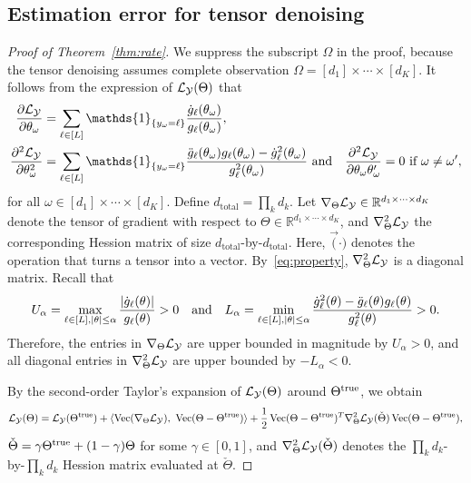 \documentclass[11pt]{article}
\theoremstyle{plain}
\theoremstyle{definition}
\providecommand{\DIFaddbegin}{} %
\providecommand{\DIFaddend}{} %
\begin{document}
\DIFaddend \subsection{Estimation error for tensor denoising}\DIFaddbegin \label{sec:proofMSE}
\DIFaddend \begin{proof}[Proof of Theorem~\ref{thm:rate}]
We suppress the subscript $\Omega$ in the proof, because the tensor denoising assumes complete observation $\Omega=[d_1]\times \cdots \times [d_K]$. It follows from the expression of $\mathcal{L}_{\mathcal{Y}}(\Theta)$ that
\begin{align}\label{eq:property}
{\partial \flogl\over \partial \theta_\omega}&=\sum_{\ell\in[L]}\mathds{1}_{\{y_{\omega}=\ell\}}
{\dot{g}_\ell(\theta_\omega)\over g_\ell(\theta_\omega)},\notag\\
{\partial^2 \flogl\over \partial \theta_\omega^2}&=\sum_{\ell\in[L]}\mathds{1}_{\{y_\omega=\ell\}}{\ddot{g}_\ell(\theta_\omega)g_\ell(\theta_\omega)-\dot{g}^2_\ell(\theta_\omega)\over g^2_\ell(\theta_\omega)}\ \text{and}\quad
{\partial^2 \flogl\over \partial \theta_\omega \theta_\omega'}=0\ \text{if}\ \omega\neq \omega',
\end{align}
for all $\omega\in[d_1]\times \cdots \times [d_K]$.
Define $d_{\text{total}}=\prod_k d_k$. Let $\nabla_{\Theta}\mathcal{L}_{\mathcal{Y}}\in\mathbb{R}^{d_1\times\cdots\times d_K}$ denote the tensor of gradient with respect to $\Theta\in\mathbb{R}^{d_1\times \cdots\times d_K}$, and $\nabla^2_{\Theta}\mathcal{L}_{\mathcal{Y}}$ the corresponding Hession matrix of size $d_\text{total}$-by-$d_{\text{total}}$. Here, $\Vec(\cdot)$ denotes the operation that turns a tensor into a vector. By~\eqref{eq:property}, $\nabla^2_{\Theta}\mathcal{L}_{\mathcal{Y}}$ is a diagonal matrix. Recall that
\begin{equation}\label{eq:bound}
U_\alpha=\max_{\ell\in[L],|\theta|\leq \alpha}{|\dot{g}_\ell(\theta)|\over g_\ell(\theta)}>0 \quad \text{and}\quad
L_\alpha=\min_{\ell\in[L],|\theta|\leq \alpha} {\dot{g}^2_\ell(\theta)-\ddot{g}_\ell(\theta)g_\ell(\theta)\over g^2_\ell(\theta)}>0.
\end{equation}
Therefore, the entries in $\nabla_{\Theta}\mathcal{L}_{\mathcal{Y}}$ are upper bounded in magnitude by $U_\alpha>0$, and all diagonal entries in $\nabla^2_{\Theta}\mathcal{L}_{\mathcal{Y}}$ are upper bounded by $-L_{\alpha}<0$.

By the second-order Taylor's expansion of $\mathcal{L}_{\mathcal{Y}}(\Theta)$ around $\Theta^{\text{true}}$, we obtain
\begin{equation}\label{eq:taylor}
\flogl(\Theta)=\flogl(\trueT)+\langle\Vec(\fplogl),\ \Vec(\Theta-\trueT)\rangle+{1\over 2}\Vec(\Theta-\trueT)^T\fpplogl(\check\Theta)\Vec(\Theta-\trueT),
\end{equation}
$\check\Theta=\gamma\Theta^{\text{true}}+(1-\gamma)\Theta$ for some $\gamma\in[0,1]$, and $\nabla^2_{\Theta}\mathcal{L}_{\mathcal{Y}}(\check\Theta)$ denotes the $\prod_kd_k$-by-$\prod_k d_k$ Hession matrix evaluated at $\check\Theta$.


\end{proof}
\end{document}
